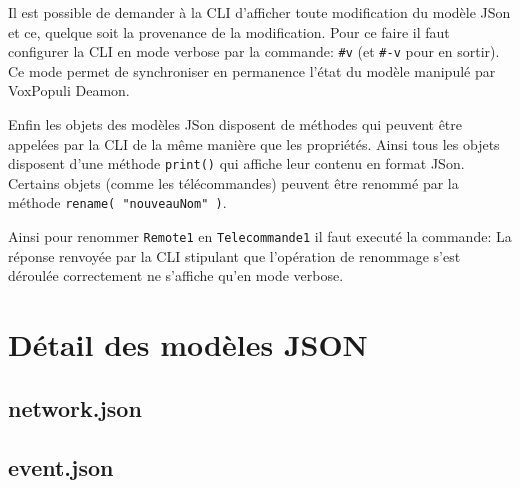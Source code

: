 \documentclass{Rapport}
\begin{document}

Il est possible de demander à la CLI d'afficher toute modification du modèle JSon et ce, quelque soit la provenance de la modification. Pour ce faire il faut configurer la CLI en mode verbose par la commande: \verb|#v| (et \verb|#-v| pour en sortir). Ce mode permet de synchroniser en permanence l'état du modèle manipulé par VoxPopuli Deamon.

Enfin les objets des modèles JSon disposent de méthodes qui peuvent être appelées par la CLI de la même manière que les propriétés. Ainsi tous les objets disposent d'une méthode \verb|print()| qui affiche leur contenu en format JSon. Certains objets (comme les télécommandes) peuvent être renommé par la méthode \verb|rename( "nouveauNom" )|.

Ainsi pour renommer \verb|Remote1| en \verb|Telecommande1| il faut executé la commande:
La réponse renvoyée par la CLI stipulant que l'opération de renommage s'est déroulée correctement ne s'affiche qu'en mode verbose.

\section{Détail des modèles JSON}

\subsection*{network.json}



\subsection*{event.json}

\end{document}
